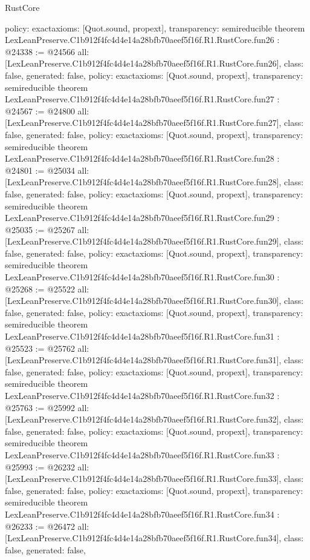 \begin{lexlean}{RustCore}
\begin{coremodule}
{  policy: exact{axioms: [Quot.sound, propext]},
  transparency: semireducible
}
theorem LexLeanPreserve.C1b912f4fc4d4e14a28bfb70aeef5f16f.R1.RustCore.fun26 : @24338 := @24566 {
  all: [LexLeanPreserve.C1b912f4fc4d4e14a28bfb70aeef5f16f.R1.RustCore.fun26],
  class: false,
  generated: false,
  policy: exact{axioms: [Quot.sound, propext]},
  transparency: semireducible
}
theorem LexLeanPreserve.C1b912f4fc4d4e14a28bfb70aeef5f16f.R1.RustCore.fun27 : @24567 := @24800 {
  all: [LexLeanPreserve.C1b912f4fc4d4e14a28bfb70aeef5f16f.R1.RustCore.fun27],
  class: false,
  generated: false,
  policy: exact{axioms: [Quot.sound, propext]},
  transparency: semireducible
}
theorem LexLeanPreserve.C1b912f4fc4d4e14a28bfb70aeef5f16f.R1.RustCore.fun28 : @24801 := @25034 {
  all: [LexLeanPreserve.C1b912f4fc4d4e14a28bfb70aeef5f16f.R1.RustCore.fun28],
  class: false,
  generated: false,
  policy: exact{axioms: [Quot.sound, propext]},
  transparency: semireducible
}
theorem LexLeanPreserve.C1b912f4fc4d4e14a28bfb70aeef5f16f.R1.RustCore.fun29 : @25035 := @25267 {
  all: [LexLeanPreserve.C1b912f4fc4d4e14a28bfb70aeef5f16f.R1.RustCore.fun29],
  class: false,
  generated: false,
  policy: exact{axioms: [Quot.sound, propext]},
  transparency: semireducible
}
theorem LexLeanPreserve.C1b912f4fc4d4e14a28bfb70aeef5f16f.R1.RustCore.fun30 : @25268 := @25522 {
  all: [LexLeanPreserve.C1b912f4fc4d4e14a28bfb70aeef5f16f.R1.RustCore.fun30],
  class: false,
  generated: false,
  policy: exact{axioms: [Quot.sound, propext]},
  transparency: semireducible
}
theorem LexLeanPreserve.C1b912f4fc4d4e14a28bfb70aeef5f16f.R1.RustCore.fun31 : @25523 := @25762 {
  all: [LexLeanPreserve.C1b912f4fc4d4e14a28bfb70aeef5f16f.R1.RustCore.fun31],
  class: false,
  generated: false,
  policy: exact{axioms: [Quot.sound, propext]},
  transparency: semireducible
}
theorem LexLeanPreserve.C1b912f4fc4d4e14a28bfb70aeef5f16f.R1.RustCore.fun32 : @25763 := @25992 {
  all: [LexLeanPreserve.C1b912f4fc4d4e14a28bfb70aeef5f16f.R1.RustCore.fun32],
  class: false,
  generated: false,
  policy: exact{axioms: [Quot.sound, propext]},
  transparency: semireducible
}
theorem LexLeanPreserve.C1b912f4fc4d4e14a28bfb70aeef5f16f.R1.RustCore.fun33 : @25993 := @26232 {
  all: [LexLeanPreserve.C1b912f4fc4d4e14a28bfb70aeef5f16f.R1.RustCore.fun33],
  class: false,
  generated: false,
  policy: exact{axioms: [Quot.sound, propext]},
  transparency: semireducible
}
theorem LexLeanPreserve.C1b912f4fc4d4e14a28bfb70aeef5f16f.R1.RustCore.fun34 : @26233 := @26472 {
  all: [LexLeanPreserve.C1b912f4fc4d4e14a28bfb70aeef5f16f.R1.RustCore.fun34],
  class: false,
  generated: false,
}
\end{coremodule}
\end{lexlean}
